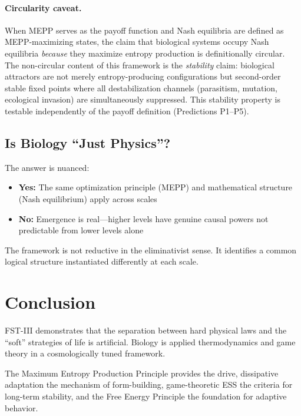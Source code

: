 \documentclass[12pt,a4paper]{article}
\theoremstyle{remark}
\begin{document}
\paragraph{Circularity caveat.} When MEPP serves as the payoff function and Nash equilibria are defined as MEPP-maximizing states, the claim that biological systems occupy Nash equilibria \emph{because} they maximize entropy production is definitionally circular. The non-circular content of this framework is the \emph{stability} claim: biological attractors are not merely entropy-producing configurations but second-order stable fixed points where all destabilization channels (parasitism, mutation, ecological invasion) are simultaneously suppressed. This stability property is testable independently of the payoff definition (Predictions P1--P5).

\subsection{Is Biology ``Just Physics''?}

The answer is nuanced:
\begin{itemize}
    \item \textbf{Yes:} The same optimization principle (MEPP) and mathematical structure (Nash equilibrium) apply across scales
    \item \textbf{No:} Emergence is real---higher levels have genuine causal powers not predictable from lower levels alone
\end{itemize}

The framework is not reductive in the eliminativist sense. It identifies a common logical structure instantiated differently at each scale.

\section{Conclusion}
\label{sec:conclusion}

FST-III demonstrates that the separation between hard physical laws and the ``soft'' strategies of life is artificial. Biology is applied thermodynamics and game theory in a cosmologically tuned framework.

The Maximum Entropy Production Principle provides the drive, dissipative adaptation the mechanism of form-building, game-theoretic ESS the criteria for long-term stability, and the Free Energy Principle the foundation for adaptive behavior.
\end{document}
